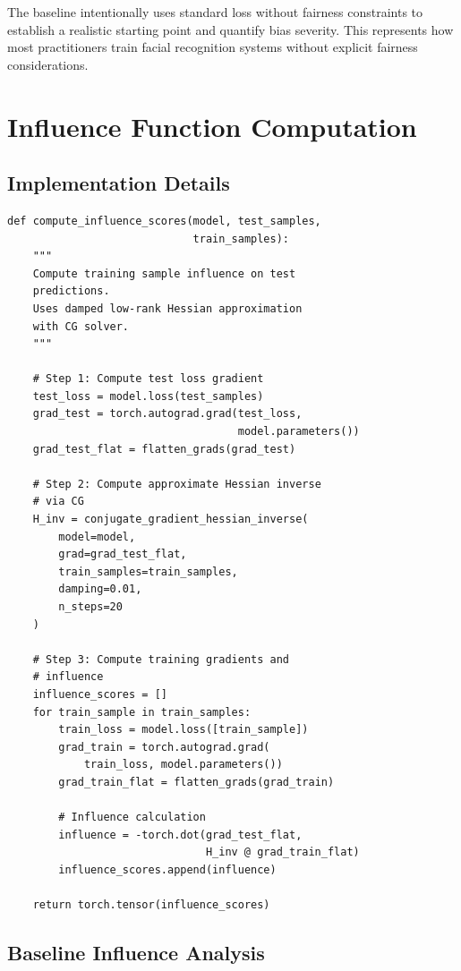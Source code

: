 \documentclass[11pt,a4paper,oneside]{report}
\begin{document}
The baseline intentionally uses standard loss without fairness constraints to establish a realistic starting point and quantify bias severity. This represents how most practitioners train facial recognition systems without explicit fairness considerations.

\section{Influence Function Computation}

\subsection{Implementation Details}

\begin{lstlisting}[caption=Influence Function Computation]
def compute_influence_scores(model, test_samples, 
                             train_samples):
    """
    Compute training sample influence on test 
    predictions.
    Uses damped low-rank Hessian approximation 
    with CG solver.
    """
    
    # Step 1: Compute test loss gradient
    test_loss = model.loss(test_samples)
    grad_test = torch.autograd.grad(test_loss, 
                                    model.parameters())
    grad_test_flat = flatten_grads(grad_test)
    
    # Step 2: Compute approximate Hessian inverse 
    # via CG
    H_inv = conjugate_gradient_hessian_inverse(
        model=model,
        grad=grad_test_flat,
        train_samples=train_samples,
        damping=0.01,
        n_steps=20
    )
    
    # Step 3: Compute training gradients and 
    # influence
    influence_scores = []
    for train_sample in train_samples:
        train_loss = model.loss([train_sample])
        grad_train = torch.autograd.grad(
            train_loss, model.parameters())
        grad_train_flat = flatten_grads(grad_train)
        
        # Influence calculation
        influence = -torch.dot(grad_test_flat, 
                               H_inv @ grad_train_flat)
        influence_scores.append(influence)
    
    return torch.tensor(influence_scores)
\end{lstlisting}

\subsection{Baseline Influence Analysis}
\end{document}
